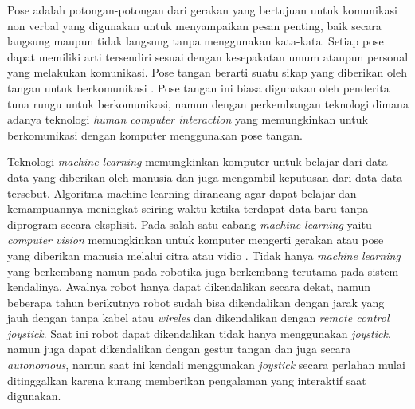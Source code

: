 Pose adalah potongan-potongan dari gerakan yang bertujuan untuk komunikasi non verbal yang digunakan untuk menyampaikan pesan penting, baik secara langsung maupun tidak langsung tanpa menggunakan kata-kata. Setiap pose dapat memiliki arti tersendiri sesuai dengan kesepakatan umum ataupun personal yang melakukan komunikasi. Pose tangan berarti suatu sikap yang diberikan oleh tangan untuk berkomunikasi \parencite{gesturtangan}. Pose tangan ini biasa digunakan oleh penderita tuna rungu untuk berkomunikasi, namun dengan perkembangan teknologi dimana adanya teknologi \textit{human computer interaction} yang memungkinkan untuk berkomunikasi dengan komputer menggunakan pose tangan. \par
Teknologi \textit{machine learning} memungkinkan komputer untuk belajar dari data-data yang diberikan oleh manusia dan juga mengambil keputusan dari data-data tersebut. Algoritma machine learning dirancang agar dapat belajar dan kemampuannya meningkat seiring waktu ketika terdapat data baru tanpa diprogram secara eksplisit. Pada salah satu cabang \textit{machine learning} yaitu \textit{computer vision} memungkinkan untuk komputer mengerti gerakan atau pose yang diberikan manusia melalui citra atau vidio \parencite{Bukusakti}. Tidak hanya \textit{machine learning} yang berkembang namun pada robotika juga berkembang terutama pada sistem kendalinya. Awalnya robot hanya dapat dikendalikan secara dekat, namun beberapa tahun berikutnya robot sudah bisa dikendalikan dengan jarak yang jauh dengan tanpa kabel atau \textit{wireles} dan dikendalikan dengan \textit{remote control joystick}. Saat ini robot dapat dikendalikan tidak hanya menggunakan \textit{joystick}, namun juga dapat dikendalikan dengan gestur tangan dan juga secara  \textit{autonomous}, namun saat ini kendali menggunakan \textit{joystick} secara perlahan mulai ditinggalkan karena kurang memberikan pengalaman yang interaktif saat digunakan. 

